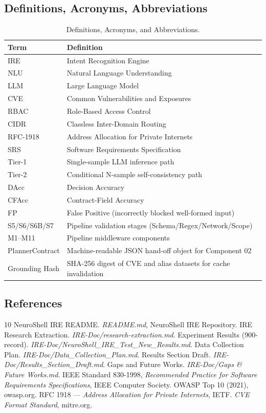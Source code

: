 ﻿\documentclass[10pt,journal,onecolumn]{IEEEtran}
\begin{document}
\subsection{Definitions, Acronyms, Abbreviations}
\begin{table}[h]
\caption{Definitions, Acronyms, and Abbreviations.}
\label{tab:definitions}
\begin{tabularx}{\columnwidth}{>{\ttfamily}l X}
\toprule
\textbf{Term} & \textbf{Definition}\\
\midrule
IRE & Intent Recognition Engine\\
NLU & Natural Language Understanding\\
LLM & Large Language Model\\
CVE & Common Vulnerabilities and Exposures\\
RBAC & Role-Based Access Control\\
CIDR & Classless Inter-Domain Routing\\
RFC-1918 & Address Allocation for Private Internets\\
SRS & Software Requirements Specification\\
Tier-1 & Single-sample LLM inference path\\
Tier-2 & Conditional N-sample self-consistency path\\
DAcc & Decision Accuracy\\
CFAcc & Contract-Field Accuracy\\
FP & False Positive (incorrectly blocked well-formed input)\\
S5/S6/S6B/S7 & Pipeline validation stages (Schema/Regex/Network/Scope)\\
M1--M11 & Pipeline middleware components\\
PlannerContract & Machine-readable JSON hand-off object for Component 02\\
Grounding Hash & SHA-256 digest of CVE and alias datasets for cache invalidation\\
\bottomrule
\end{tabularx}
\end{table}

\subsection{References}
\begin{thebibliography}{10}
 NeuroShell IRE README. \emph{README.md}, NeuroShell IRE Repository.
 IRE Research Extraction. \emph{IRE-Doc/research-extraction.md}.
 Experiment Results (900-record). \emph{IRE-Doc/NeuroShell\_IRE\_Test\_New\_Results.md}.
 Data Collection Plan. \emph{IRE-Doc/Data\_Collection\_Plan.md}.
 Results Section Draft. \emph{IRE-Doc/Results\_Section\_Draft.md}.
 Gaps and Future Works. \emph{IRE-Doc/Gaps \& Future Works.md}.
 IEEE Standard 830-1998, \emph{Recommended Practice for Software Requirements Specifications}, IEEE Computer Society.
 OWASP Top 10 (2021), owasp.org.
 RFC 1918 --- \emph{Address Allocation for Private Internets}, IETF.
 \emph{CVE Format Standard}, mitre.org.
\end{thebibliography}
\end{document}

